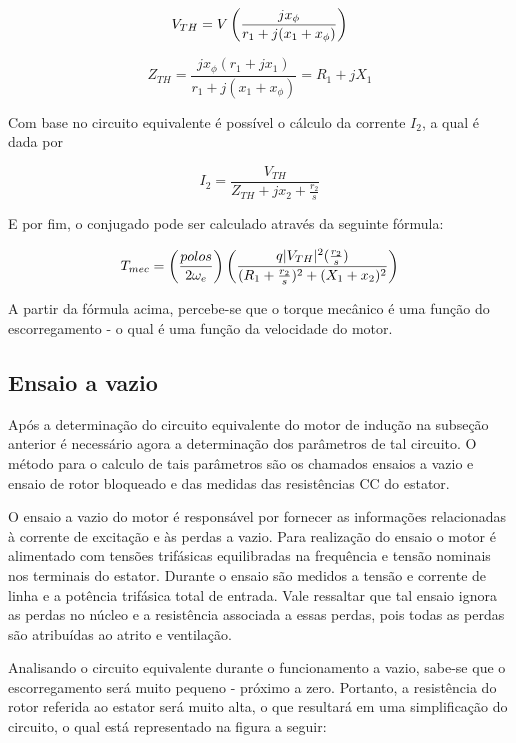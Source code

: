              $${V}_{TH} = V \left(\frac{jx_{\phi}}{r_1 + j(x_1 + x_{\phi})}\right)$$
             
             $$Z_{TH} = \frac{jx_{\phi}(r_1+ jx_1)}{r_1 + j(x_1 + x_{\phi})} = R_1 + jX_1$$
    
\par Com base no circuito equivalente é possível o cálculo da corrente $I_2$, a qual é dada por 

        $${I}_2 = \frac{V_{TH}}{Z_{TH} + jx_2 + \frac{r_2}{s}}$$

\par E por fim, o conjugado pode ser calculado através da seguinte fórmula:

        $$T_{mec} = \left(\frac{polos}{2\omega_e}\right)\left(\frac{q|V_{TH}|^2(\frac{r_2}{s})}{(R_1 + \frac{r_2}{s})^2 + (X_1 + x_2)^2}\right)$$
        
\par A partir da fórmula acima, percebe-se que o torque mecânico é uma função do escorregamento - o qual é uma função da velocidade do motor.



\subsection{Ensaio a vazio}

\par Após a determinação do circuito equivalente do motor de indução na subseção anterior é necessário agora a determinação dos parâmetros de tal circuito. O método para o calculo de tais parâmetros são os chamados ensaios a vazio e ensaio de rotor bloqueado e das medidas das resistências CC do estator.

\par O ensaio a vazio do motor é responsável por fornecer as informações relacionadas à corrente de excitação e às perdas a vazio. Para realização do ensaio o motor é alimentado com tensões trifásicas equilibradas na frequência e tensão nominais nos terminais do estator. Durante o ensaio são medidos a tensão e corrente de linha e a potência trifásica total de entrada. Vale ressaltar que tal ensaio ignora as perdas no núcleo e a resistência associada a essas perdas, pois todas as perdas são atribuídas ao atrito e ventilação.

\par Analisando o circuito equivalente durante o funcionamento a vazio, sabe-se que o escorregamento será muito pequeno - próximo a zero. Portanto, a resistência do rotor referida ao estator será muito alta, o que resultará em uma simplificação do circuito, o qual está representado na figura a seguir:

